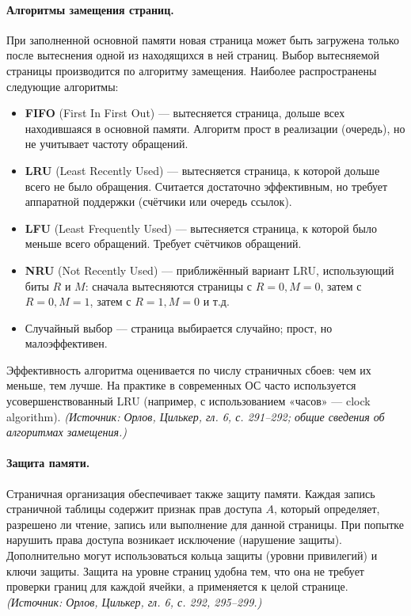 \documentclass[a4paper,12pt]{article}
\begin{document}
\paragraph{Алгоритмы замещения страниц.}
При заполненной основной памяти новая страница может быть загружена только после вытеснения одной из находящихся в ней страниц. Выбор вытесняемой страницы производится по алгоритму замещения. Наиболее распространены следующие алгоритмы:
\begin{itemize}
\item \textbf{FIFO} (First In First Out) --- вытесняется страница, дольше всех находившаяся в основной памяти. Алгоритм прост в реализации (очередь), но не учитывает частоту обращений.
\item \textbf{LRU} (Least Recently Used) --- вытесняется страница, к которой дольше всего не было обращения. Считается достаточно эффективным, но требует аппаратной поддержки (счётчики или очередь ссылок).
\item \textbf{LFU} (Least Frequently Used) --- вытесняется страница, к которой было меньше всего обращений. Требует счётчиков обращений.
\item \textbf{NRU} (Not Recently Used) --- приближённый вариант LRU, использующий биты \(R\) и \(M\): сначала вытесняются страницы с \(R=0,M=0\), затем с \(R=0,M=1\), затем с \(R=1,M=0\) и т.д.
\item Случайный выбор --- страница выбирается случайно; прост, но малоэффективен.
\end{itemize}
Эффективность алгоритма оценивается по числу страничных сбоев: чем их меньше, тем лучше. На практике в современных ОС часто используется усовершенствованный LRU (например, с использованием «часов» --- clock algorithm).
\textit{(Источник: Орлов, Цилькер, гл. 6, с. 291--292; общие сведения об алгоритмах замещения.)}

\paragraph{Защита памяти.}
Страничная организация обеспечивает также защиту памяти. Каждая запись страничной таблицы содержит признак прав доступа \(A\), который определяет, разрешено ли чтение, запись или выполнение для данной страницы. При попытке нарушить права доступа возникает исключение (нарушение защиты). Дополнительно могут использоваться кольца защиты (уровни привилегий) и ключи защиты. Защита на уровне страниц удобна тем, что она не требует проверки границ для каждой ячейки, а применяется к целой странице.
\textit{(Источник: Орлов, Цилькер, гл. 6, с. 292, 295--299.)}
\end{document}

